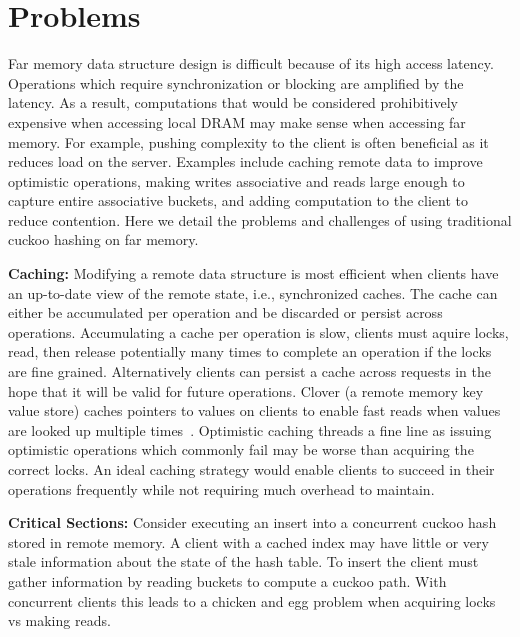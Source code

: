 \section{Problems}
\label{sec:problems}

Far memory data structure design is difficult because of
its high access latency. Operations which require
synchronization or blocking are amplified by the latency.
As a result, computations that would be considered prohibitively expensive when accessing local DRAM may make sense when accessing far
memory. For example, pushing complexity to the client is
often beneficial as it reduces load on the server. Examples
include caching remote data to improve optimistic
operations, making writes associative and reads large enough
to capture entire associative buckets, and adding
computation to the client to reduce contention. Here we
detail the problems and challenges of using traditional
cuckoo hashing on far memory.


\textbf{Caching:} Modifying a remote data structure is most efficient when 
clients have an up-to-date view of the remote state, i.e., synchronized caches. The cache can either be
accumulated per operation and be discarded or persist across
operations.  Accumulating a cache per operation is slow,
clients must aquire locks, read, then release potentially
many times to complete an operation if the locks are fine
grained. Alternatively clients can persist a cache across
requests in the hope that it will be valid for future
operations.  Clover (a remote memory key value store) caches
pointers to values on clients to enable fast reads when
values are looked up multiple times~\cite{clover}.
Optimistic caching threads a fine line as issuing optimistic
operations which commonly fail may be worse than acquiring
the correct locks.  An ideal caching strategy would enable
clients to succeed in their operations frequently while not
requiring much overhead to maintain. 


\textbf{Critical Sections:} Consider executing an insert
into a concurrent cuckoo hash stored in remote memory. A
client with a cached index may have little or very stale
information about the state of the hash table. To insert the
client must gather information by reading buckets to compute
a cuckoo path. With concurrent clients this leads to a
chicken and egg problem when acquiring locks vs making
reads.

